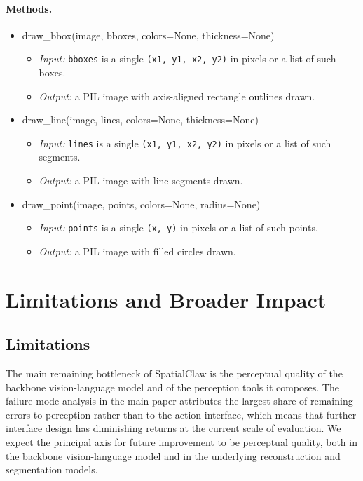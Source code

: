 \documentclass{llmxive}
\providecommand{\ours}{SpatialClaw}
\providecommand{\apicode}[1]{#1}
\begin{document}
\paragraph{Methods.}
\begin{itemize}[leftmargin=1.5em]
\item \apicode{draw_bbox(image, bboxes, colors=None, thickness=None)}
  \begin{itemize}
  \item \emph{Input:} \texttt{bboxes} is a single \texttt{(x1, y1, x2, y2)} in pixels or a list of such boxes.
  \item \emph{Output:} a PIL image with axis-aligned rectangle outlines drawn.
  \end{itemize}
\item \apicode{draw_line(image, lines, colors=None, thickness=None)}
  \begin{itemize}
  \item \emph{Input:} \texttt{lines} is a single \texttt{(x1, y1, x2, y2)} in pixels or a list of such segments.
  \item \emph{Output:} a PIL image with line segments drawn.
  \end{itemize}
\item \apicode{draw_point(image, points, colors=None, radius=None)}
  \begin{itemize}
  \item \emph{Input:} \texttt{points} is a single \texttt{(x, y)} in pixels or a list of such points.
  \item \emph{Output:} a PIL image with filled circles drawn.
  \end{itemize}
\end{itemize}


\section{Limitations and Broader Impact}
\label{app:limitations}

\subsection{Limitations}
\label{app:limitations_sub}
The main remaining bottleneck of \ours{} is the perceptual quality of the backbone vision-language model and of the perception tools it composes. The failure-mode analysis in the main paper attributes the largest share of remaining errors to perception rather than to the action interface, which means that further interface design has diminishing returns at the current scale of evaluation. We expect the principal axis for future improvement to be perceptual quality, both in the backbone vision-language model and in the underlying reconstruction and segmentation models.
\end{document}
